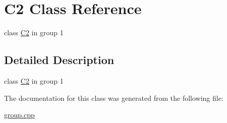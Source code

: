 \hypertarget{class_c2}{\section{C2 Class Reference}
\label{class_c2}
}


class \hyperlink{class_c2}{C2} in group 1  




\subsection{Detailed Description}
class \hyperlink{class_c2}{C2} in group 1 

The documentation for this class was generated from the following file\-:\begin{DoxyCompactItemize}
\item 
\hyperlink{group_8cpp}{group.\-cpp}\end{DoxyCompactItemize}
